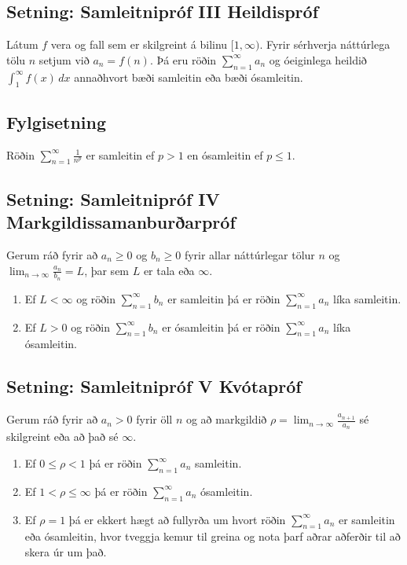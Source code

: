 \documentclass[a4paper,10pt,icelandic]{sphinxmanual}
\begin{document}
\subsection{Setning: Samleitnipróf III \textendash{} Heildispróf}
\label{\detokenize{kafli09:setning-samleitniprof-iii-heildisprof}}
Látum \(f\) vera  og  fall sem er
skilgreint á bilinu \([1, \infty)\). Fyrir sérhverja náttúrlega tölu
\(n\) setjum við \(a_n=f(n)\). Þá eru röðin
\(\sum_{n=1}^\infty a_n\) og óeiginlega heildið
\(\int_1^\infty f(x)\,dx\) annaðhvort bæði samleitin eða bæði
ósamleitin.


\subsection{Fylgisetning}
\label{\detokenize{kafli09:id10}}
Röðin \(\sum_{n=1}^\infty\frac{1}{n^{p}}\) er samleitin ef
\(p>1\) en ósamleitin ef \(p\leq 1\).


\subsection{Setning: Samleitnipróf IV \textendash{} Markgildissamanburðarpróf}
\label{\detokenize{kafli09:setning-samleitniprof-iv-markgildissamanburarprof}}
Gerum ráð fyrir að \(a_n\geq 0\) og \(b_n\geq 0\) fyrir allar
náttúrlegar tölur \(n\) og
\(\lim_{n\rightarrow\infty}\frac{a_n}{b_n}=L\), þar sem \(L\) er
tala eða \(\infty\).
\begin{enumerate}
\item {} 
Ef \(L<\infty\) og röðin \(\sum_{n=1}^\infty b_n\) er
samleitin þá er röðin \(\sum_{n=1}^\infty a_n\) líka samleitin.

\item {} 
Ef \(L>0\) og röðin \(\sum_{n=1}^\infty b_n\) er ósamleitin
þá er röðin \(\sum_{n=1}^\infty a_n\) líka ósamleitin.

\end{enumerate}


\subsection{Setning: Samleitnipróf V \textendash{} Kvótapróf}
\label{\detokenize{kafli09:setning-samleitniprof-v-kvotaprof}}
Gerum ráð fyrir að \(a_n>0\) fyrir öll \(n\) og að markgildið
\(\rho=\lim_{n\rightarrow\infty}\frac{a_{n+1}}{a_n}\) sé skilgreint
eða að það sé \(\infty\).
\begin{enumerate}
\item {} 
Ef \(0\leq\rho<1\) þá er röðin \(\sum_{n=1}^\infty a_n\)
samleitin.

\item {} 
Ef \(1<\rho\leq \infty\) þá er röðin
\(\sum_{n=1}^\infty a_n\) ósamleitin.

\item {} 
Ef \(\rho=1\) þá er ekkert hægt að fullyrða um hvort röðin
\(\sum_{n=1}^\infty a_n\) er samleitin eða ósamleitin, hvor
tveggja kemur til greina og nota þarf aðrar aðferðir til að skera
úr um það.

\end{enumerate}
\end{document}
